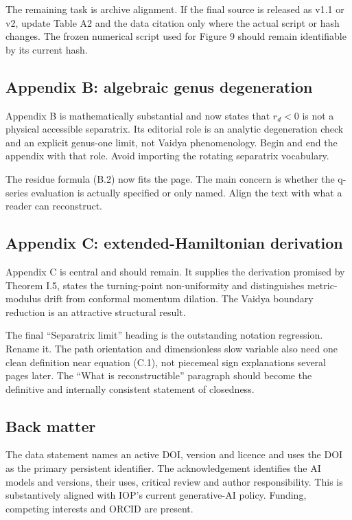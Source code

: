 \documentclass[11pt,a4paper]{article}
\begin{document}
The remaining task is archive alignment. If the final source is released as v1.1 or v2, update
Table A2 and the data citation only where the actual script or hash changes. The frozen numerical
script used for Figure 9 should remain identifiable by its current hash.

\subsection{Appendix B: algebraic genus degeneration}

Appendix B is mathematically substantial and now states that $r_d<0$ is not a physical accessible
separatrix. Its editorial role is an analytic degeneration check and an explicit genus-one limit,
not Vaidya phenomenology. Begin and end the appendix with that role. Avoid importing the rotating
separatrix vocabulary.

The residue formula (B.2) now fits the page. The main concern is whether the q-series evaluation
is actually specified or only named. Align the text with what a reader can reconstruct.

\subsection{Appendix C: extended-Hamiltonian derivation}

Appendix C is central and should remain. It supplies the derivation promised by Theorem I.5,
states the turning-point non-uniformity and distinguishes metric-modulus drift from conformal
momentum dilation. The Vaidya boundary reduction is an attractive structural result.

The final ``Separatrix limit'' heading is the outstanding notation regression. Rename it. The
path orientation and dimensionless slow variable also need one clean definition near equation
(C.1), not piecemeal sign explanations several pages later. The ``What is reconstructible''
paragraph should become the definitive and internally consistent statement of closedness.

\subsection{Back matter}

The data statement names an active DOI, version and licence and uses the DOI as the primary
persistent identifier. The acknowledgement identifies the AI models and versions, their uses,
critical review and author responsibility. This is substantively aligned with IOP's current
generative-AI policy. Funding, competing interests and ORCID are present.
\end{document}

